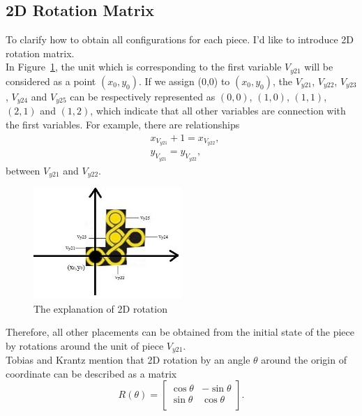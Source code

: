 \subsection{2D Rotation Matrix}
\label{section:2Drotationmatrix}
To clarify how to obtain all configurations for each piece. I'd like to introduce 2D rotation matrix. 
\\In Figure~\ref{fig:explanation2D}, the unit which is corresponding to the first variable $V_{y21}$ will be considered as a point $(x_{0},y_{0})$. If we assign (0,0) to $(x_{0},y_{0})$, the $V_{y21}$, $V_{y22}$, $V_{y23}$, $V_{y24}$ and $V_{y25}$ can be respectively represented as $(0,0)$, $(1,0)$, $(1,1)$, $(2,1)$ and $(1,2)$, which indicate that all other variables are connection with the first variables. For example, there are relationships
\begin{equation}
\begin{aligned}
&x_{V_{y21}}+1=x_{V_{y22}},\\
&y_{V_{y21}}=y_{V_{y22}},
\end{aligned}
\end{equation}
between $V_{y21}$ and $V_{y22}$.
\begin{figure}[htbp]
\centering
\includegraphics[width=0.5\textwidth]{figs/explanation2D.jpg}
\caption{The explanation of 2D rotation}
    \label{fig:explanation2D}
\end{figure}
Therefore, all other placements can be obtained from the initial state of the piece by rotations around the unit of piece $V_{y21}$.\\
Tobias and Krantz \cite{r9} mention that 2D rotation by an angle $\theta$ around the origin of coordinate can be described as a matrix
\begin{equation}
R(\theta)=\begin{bmatrix}
\cos\theta & -\sin\theta\\
\sin\theta & \cos\theta\\
\end{bmatrix}.
\end{equation}
